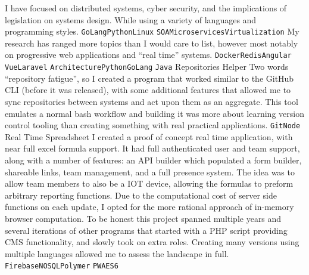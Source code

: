 \documentclass[9pt]{developercv} %
\begin{document}
\begin{entrylist}
    {
        I have focused on distributed systems, cyber security, and the
        implications of legislation on systems design. While using a variety of
        languages and programming styles.
        \texttt{GoLang}\slashsep\texttt{Python}\slashsep\texttt{Linux}
        \slashsep\texttt{SOA}\slashsep\texttt{Microservices}\slashsep\texttt{Virtualization}
    }
    {
        My research has ranged more topics than I would care to list, however
        most notably on progressive web applications and \enquote{real time} systems.
        \texttt{Docker}\slashsep\texttt{Redis}\slashsep\texttt{Angular}
        \slashsep\texttt{Vue}\slashsep\texttt{Laravel}\slashsep
        \texttt{Architecture}\slashsep\texttt{Python}\slashsep\texttt{GoLang}
        \slashsep\texttt{Java}
    }
     {Repositories Helper} {}
    {
        Two words \enquote{repository fatigue}, so I created a program that worked
        similar to the GitHub CLI (before it was released), with some additional
        features that allowed me to sync repositories between systems and act
        upon them as an aggregate. This tool emulates a normal bash workflow and
        building it was more about learning version control tooling than creating
        something with real practical applications.
        \texttt{Git}\slashsep\texttt{Node}
    }
     {Real Time Spreadsheet} {}
    {
        I created a proof of concept real time application, with near full excel
        formula support. It had full authenticated user and team support, along
        with a number of features: an API builder which populated a form builder,
        shareable links, team management, and a full presence system. The idea
        was to allow team members to also be a IOT device, allowing the formulas
        to preform arbitrary reporting functions. Due to the computational cost
        of server side functions on each update, I opted for the more rational
        approach of in-memory browser computation. To be honest this project
        spanned multiple years and several iterations of other programs that
        started with a PHP script providing CMS functionality, and slowly took on
        extra roles. Creating many versions using multiple languages allowed me to
        assess the landscape in full.
        \texttt{Firebase}\slashsep\texttt{NOSQL}\slashsep\texttt{Polymer}\slashsep
        \texttt{PWA}\slashsep\texttt{ES6}
    }
\end{entrylist}



\vspace{1cm}

\cvfooter
\end{document}
